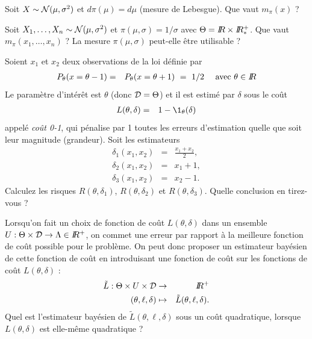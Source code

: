 \documentclass[10pt]{article}
\begin{document}

\begin{exec}\label{exo4}
Soit $X\sim {\cal{N}}(\mu,\sigma^2)$ et $d\pi(\mu) = d \mu$ (mesure de Lebesgue). Que vaut $m_{\pi}(x)$ ? 
\end{exec}
 

\begin{exec}\label{exo5}
Soit $X_1,\ldots,X_n\sim {\cal{N}}(\mu,\sigma^2)$ et $\pi(\mu,\sigma) = 1/\sigma$ avec $\Theta=I\!\!R \times I\!\!R^+_*$.  Que vaut $m_{\pi}(x_1,\ldots,x_n)$ ? La mesure $\pi(\mu,\sigma)$ peut-elle être utilisable ?
\end{exec}

\begin{exec}\label{exo6}
Soient $x_1 $ et $x_2$ deux observations de la loi définie par \begin{eqnarray*}
P_{\theta}(x=\theta-1) & = & P_{\theta}(x=\theta+1) \ = \ 1/2 \ \ \ \ \text{avec $\theta\in\R$}
\end{eqnarray*}
Le paramètre d'intér\^et est $\theta$ (donc ${\cal{D}}=\Theta$) et il est estimé par $\delta$ sous le co\^ut
\begin{eqnarray*}
L(\theta,\delta) & = & 1 - \1_{\theta}(\delta)
\end{eqnarray*}
appelé  \emph{co\^ut 0-1}, qui pénalise par 1 toutes les erreurs d'estimation quelle que soit leur magnitude (grandeur). Soit les estimateurs
\begin{eqnarray*}
\delta_1(x_1,x_2) & = & \frac{x_1+x_2}{2}, \\
\delta_2(x_1,x_2) & = & x_1 + 1, \\
\delta_3(x_1,x_2) & = & x_2 - 1. 
\end{eqnarray*}
Calculez les risques $R(\theta,\delta_1)$, $R(\theta,\delta_2)$ et $R(\theta,\delta_3)$. Quelle conclusion en tirez-vous ? 
\end{exec}

\begin{exec}
Lorsqu'on fait un choix de fonction de coût $L(\theta,\delta)$ dans un ensemble $U:\Theta\times{\cal{D}}\to\Lambda\in I\!\!R^+$, on commet une erreur par rapport à la meilleure fonction de coût possible pour le problème. On peut donc proposer un estimateur bayésien de cette fonction de coût en introduisant une fonction de coût sur les fonctions de coût $L(\theta,\delta)$ :
\begin{eqnarray*}
\tilde{L}: \Theta\times U \times {\cal{D}}  & \to & I\!\!R^+ \\
(\theta,\ell,\delta) & \mapsto & \tilde{L}(\theta,\ell,\delta).
\end{eqnarray*}
Quel est l'estimateur bayésien de $\tilde{L}(\theta,\ell,\delta)$ sous un coût quadratique, lorsque $L(\theta,\delta)$ est elle-même quadratique ?
\end{exec}
\end{document}
